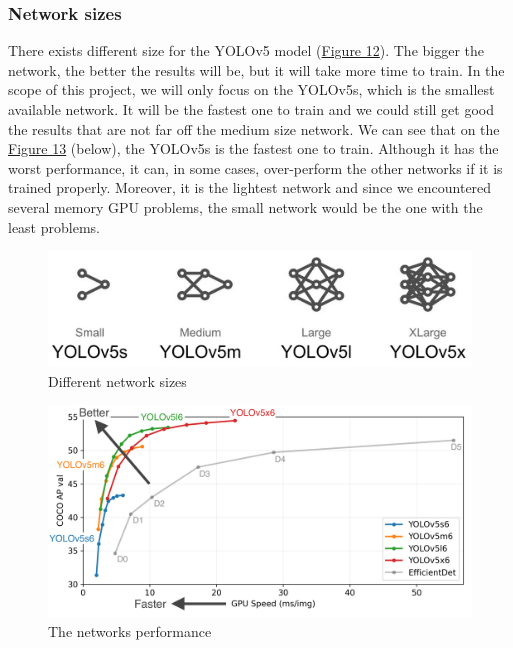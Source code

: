 \documentclass{article}
\begin{document}
\bigskip

\subsubsection{Network sizes}

There exists different size for the YOLOv5 model (\hyperref[Figure 12]{Figure 12}). The bigger the network, the better the results will be, but it will take more time to train. In the scope of this project, we will only focus on the YOLOv5s, which is the smallest available network. It will be the fastest one to train and we could still get good the results that are not far off the medium size network. We can see that on the \hyperref[Figure 13]{Figure 13} (below), the YOLOv5s is the fastest one to train. Although it has the worst performance, it can, in some cases, over-perform the other networks if it is trained properly.
Moreover, it is the lightest network and since we encountered several memory GPU problems, the small network would be the one with the least problems. 

\begin{figure}[!ht]
  \centering
  \includegraphics[scale=0.55]{YOLOv5/networksize.jpg}
  \caption{Different network sizes ~\cite{yolov5size}}
  \label{Figure 12}
\end{figure}

\begin{figure}[!ht]
  \centering
  \includegraphics[scale=0.75]{YOLOv5/performance.png}
  \caption{The networks performance ~\cite{yolov5}}
  \label{Figure 13}
\end{figure}
\end{document}
